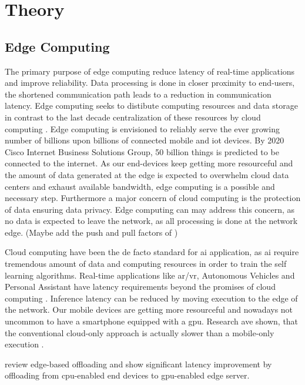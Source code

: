 \hypertarget{theory}{%
	\chapter{Theory}\label{ch:theory}}
\thispagestyle{fancy}

\section{Edge Computing}

The primary purpose of edge computing reduce latency of real-time applications and improve reliability. Data processing is done in closer proximity to end-users, the shortened communication path leads to a reduction in communication latency. Edge computing seeks to distibute computing resources and data storage in contrast to the last decade centralization of these resources by cloud computing \cite{shi_edge_2016}. Edge computing is envisioned to reliably serve the ever growing number of billions upon billions of connected mobile and \gls{iot} devices. By 2020 Cisco Internet Business Solutions Group, 50 billion things is predicted to be connected to the internet.  As our end-devices keep getting more resourceful and the amount of data generated at the edge is expected to overwhelm cloud data centers and exhaust available bandwidth, edge computing is a possible and necessary step. Furthermore a major concern of cloud computing is the protection of data ensuring data privacy. Edge computing can may address this concern, as no data is expected to leave the network, as all processing is done at the network edge. (Maybe add the push and pull factors of \cite{zhou_edge_2019}) 

Cloud computing have been the de facto standard for \gls{ai} application, as \gls{ai} require tremendous amount of data and computing resources in order to train the self learning algorithms. Real-time applications like \gls{ar}/\gls{vr}, Autonomous Vehicles and Personal Assistant have latency requirements beyond the promises of cloud computing \cite{bibid}. Inference latency can be reduced by moving execution to the edge of the network. Our mobile devices are getting more resourceful and nowadays not uncommon to have a smartphone equipped with a \gls{gpu}. Research ave shown, that the conventional cloud-only approach is actually slower than a mobile-only execution \cite{kang_neurosurgeon:_2017}.

\cite{karlsen_prototyping_nodate} review edge-based offloading and show significant latency improvement by offloading from \gls{cpu}-enabled end devices to \gls{gpu}-enabled edge server. 


